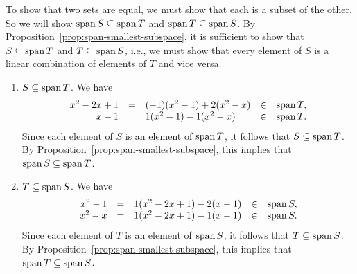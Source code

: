 \begin{solution}
  To show that two sets are equal, we must show that each is a subset
  of the other. So we will show $\sspan S \subseteq \sspan T$ and
  $\sspan T \subseteq \sspan S$. By
  Proposition~\ref{prop:span-smallest-subspace}, it is sufficient to show that
  $S\subseteq \sspan T$ and $T\subseteq \sspan S$, i.e., we must show
  that every element of $S$ is a linear combination of elements of $T$
  and vice versa.
  \begin{enumerate}
  \item $S \subseteq \sspan T$. We have
    \begin{equation*}
      \begin{array}{rclcl}
      x^2-2x+1 &=& (-1)(x^2-1) + 2(x^2-x) &\in& \sspan T, \\
      x-1 &=& 1(x^2-1) - 1(x^2-x) &\in& \sspan T.
      \end{array}
    \end{equation*}
    Since each element of $S$ is an element of $\sspan T$, it follows
    that $S\subseteq\sspan T$. By
    Proposition~\ref{prop:span-smallest-subspace}, this implies that
    $\sspan S\subseteq \sspan T$.
  \item $T \subseteq \sspan S$. We have
    \begin{equation*}
      \begin{array}{rclcl}
        x^2-1 &=& 1(x^2-2x+1) - 2(x-1) &\in& \sspan S, \\
        x^2-x &=& 1(x^2-2x+1) - 1(x-1) &\in& \sspan S.
      \end{array}
    \end{equation*}
    Since each element of $T$ is an element of $\sspan S$, it follows
    that $T\subseteq\sspan S$. By
    Proposition~\ref{prop:span-smallest-subspace}, this implies that
    $\sspan T\subseteq \sspan S$.
  \end{enumerate}
\end{solution}
